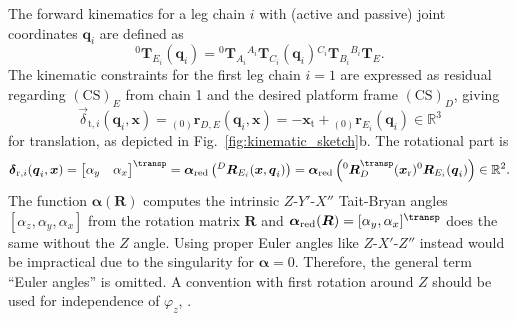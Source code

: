 \documentclass[
	graybox,
	vecphys] %
	{svmult}
\newcommand{\bm}[1]{\boldsymbol{#1}}
\newcommand{\ks}[1]{{(\mathrm{CS})}_{#1}}
\newcommand{\ortvek}[4]{{ }_{(#1)}{\boldsymbol{#2}}^{#3}_{#4} }
\newcommand{\trmat}[2]{{{ }^{#1}\boldsymbol{T}}_{#2}}
\newcommand{\rotmat}[2]{{{ }^{#1}\boldsymbol{R}}_{#2}}
\newcommand{\Res}[0]{\vec{\delta}}
\begin{document}
The forward kinematics for a leg chain $i$ with (active and passive) joint coordinates $\bm{q}_i$ are defined as
%
\vspace{-0.1cm}
\begin{equation}
\trmat{0}{E_i}(\bm{q}_i)=\trmat{0}{A_i} \trmat{A_i}{C_i}(\bm{q}_i)  \trmat{C_i}{B_i} \trmat{B_i}{E}.
\label{eq:fkine_leg}
\end{equation}
%
The kinematic constraints for the first leg chain $i{=}1$ are expressed as residual regarding $\ks{E}$ from chain 1 and the desired platform frame $\ks{D}$, giving
%
\vspace{-0.1cm}
\begin{equation}
\Res_{\mathrm{t},i}(\bm{q}_i,\bm{x})
=
\ortvek{0}{r}{}{D,E}(\bm{q}_i,\bm{x})
=
- \bm{x}_{\mathrm{t}} + \ortvek{0}{r}{}{E_i}(\bm{q}_i) \in {\mathbb{R}}^{3}
\label{eq:phi_trans}
\end{equation}
\vspace{-0.1cm}
%
for translation, as depicted in Fig.~\ref{fig:kinematic_sketch}b.
The rotational part is
\begin{equation}
\Res_{\mathrm{r},i}(\bm{q}_i,\bm{x})
=
\begin{bmatrix}
\alpha_y & \alpha_x
\end{bmatrix}^\transp
=
\bm{\alpha}_\mathrm{red}\left(\rotmat{D}{E_i}(\bm{x},\bm{q}_i)\right)
=
\bm{\alpha}_\mathrm{red}\left(\rotmat{0}{D}^\transp (\bm{x}_{\mathrm{r}})\rotmat{0}{E_i}(\bm{q}_i)\right) \in {\mathbb{R}}^{2}.
\label{eq:phi1_rot}
\end{equation}
%
The function $\bm{\alpha}(\bm{R})$ computes the intrinsic $Z$-$Y'$-$X''$ Tait-Bryan angles  $[\alpha_z,\alpha_y,\alpha_x]$ from the rotation matrix $\bm{R}$ and $\bm{\alpha}_\mathrm{red}(\bm{R})=[\alpha_y,\alpha_x]^\transp$ does the same without the $Z$ angle.
Using proper Euler angles like $Z$-$X'$-$Z''$ instead would be impractical due to the singularity for $\bm{\alpha}=0$. Therefore, the general term ``Euler angles'' is omitted. %
A convention with first rotation around $Z$ should be used for independence of $\varphi_z$, \cite{SchapplerTapOrt2019}.
\end{document}
